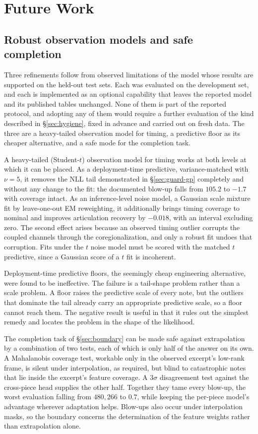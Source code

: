 \chapter{Future Work}\label{ch:future}

\section{Robust observation models and safe completion}
Three refinements follow from observed limitations of the model whose
results are supported on the held-out test sets. Each was evaluated on the
development set, and each is implemented as an optional capability that
leaves the reported model and its published tables unchanged. None of them
is part of the reported protocol, and adopting any of them would require a
further evaluation of the kind described in \S\ref{sec:hygiene}, fixed in
advance and carried out on fresh data. The three are a heavy-tailed
observation model for timing, a predictive floor as its cheaper alternative,
and a safe mode for the completion task.

A heavy-tailed (Student-$t$) observation model for timing works at both
levels at which it can be placed. As a deployment-time predictive,
variance-matched with $\nu = 5$, it removes the NLL tail demonstrated in
\S\ref{sec:guard-gp} completely and without any change to the fit: the
documented blow-up falls from $105.2$ to $-1.7$ with coverage intact. As an
inference-level noise model, a Gaussian scale mixture fit by leave-one-out
EM reweighting, it additionally brings timing coverage to nominal and
improves articulation recovery by $-0.018$, with an interval excluding zero.
The second effect arises because an observed timing outlier corrupts the
coupled channels through the coregionalization, and only a robust fit undoes
that corruption. Fits under the $t$ noise model must be scored with the
matched $t$ predictive, since a Gaussian score of a $t$ fit is incoherent.

Deployment-time predictive floors, the seemingly cheap engineering
alternative, were found to be ineffective. The failure is a tail-shape
problem rather than a scale problem. A floor raises the predictive scale of
every note, but the outliers that dominate the tail already carry an
appropriate predictive scale, so a floor cannot reach them. The negative
result is useful in that it rules out the simplest remedy and locates the
problem in the shape of the likelihood.

The completion task of \S\ref{sec:boundary} can be made safe against
extrapolation by a combination of two tests, each of which is only half of
the answer on its own. A Mahalanobis coverage test, workable only in the
observed excerpt's low-rank frame, is silent under interpolation, as
required, but blind to catastrophic notes that lie inside the excerpt's
feature coverage. A $3\sigma$ disagreement test against the cross-piece head
supplies the other half. Together they tame every blow-up, the worst
evaluation falling from $480{,}266$ to $0.7$, while keeping the per-piece
model's advantage wherever adaptation helps. Blow-ups also occur under
interpolation masks, so the boundary concerns the determination of the
feature weights rather than extrapolation alone.

